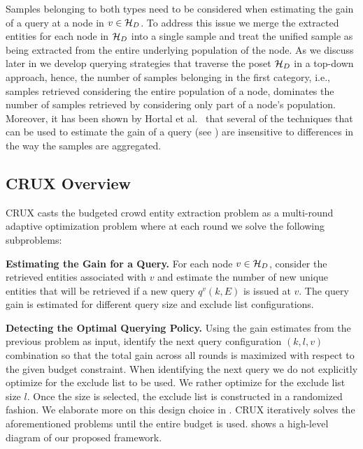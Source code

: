 Samples belonging to both types need to be considered when estimating the gain of a query at a node in $v \in \mathcal{H}_D$. To address this issue we merge the extracted entities for each node in $\mathcal{H}_D$ into a single sample and treat the unified sample as being extracted from the entire underlying population of the node. As we discuss later in  we develop querying strategies that traverse the poset $\mathcal{H}_D$ in a top-down approach, hence, the number of samples belonging in the first category, i.e., samples retrieved considering the entire population of a node, dominates the number of samples retrieved by considering only part of a node's population. Moreover, it has been shown by Hortal et al.~\cite{hortal2006evaluating} that several of the techniques that can be used to estimate the gain of a query (see ) are insensitive to differences in the way the samples are aggregated.
\fi
\subsection{CRUX Overview}
\label{sec:framework}
CRUX casts the budgeted crowd entity extraction problem as a multi-round adaptive optimization problem where at each round we solve the following subproblems: 
\squishlist 
\item \textbf{Estimating the Gain for a Query.} For each node $v \in \mathcal{H}_D$, consider the retrieved entities associated with $v$ and estimate the number of new unique entities that will be retrieved if a new query $q^v(k,E)$ is issued at $v$. The query gain is estimated for different query size and exclude list configurations.
\item \textbf{Detecting the Optimal Querying Policy.} Using the gain estimates from the previous problem as input, identify the next query configuration $(k,l,v)$ combination so that the total gain across all rounds is maximized with respect to the given budget constraint. When identifying the next query we do not explicitly optimize for the exclude list to be used. We rather optimize for the exclude list size $l$. Once the size is selected, the exclude list is constructed in a randomized fashion. We elaborate more on this design choice in .
\squishend
CRUX iteratively solves the aforementioned problems until the entire budget is used.  shows a high-level diagram of our proposed framework.

